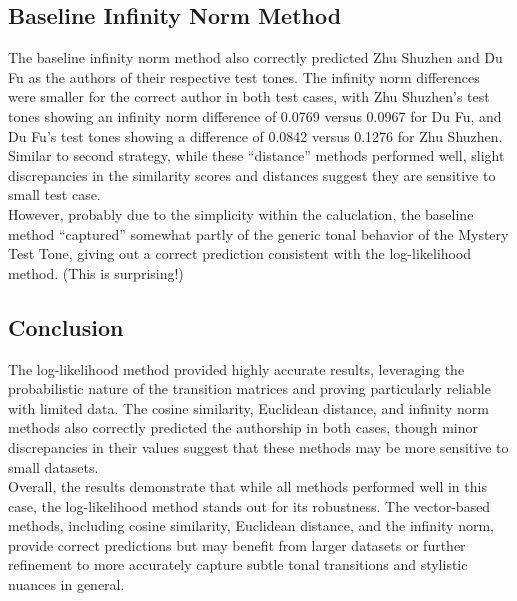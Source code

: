 \documentclass[12pt]{article}
\begin{document}
\subsection*{Baseline Infinity Norm Method}
The baseline infinity norm method also correctly predicted Zhu Shuzhen and Du Fu as the authors of their respective test tones. The infinity norm differences were smaller for the correct author in both test cases, with Zhu Shuzhen's test tones showing an infinity norm difference of 0.0769 versus 0.0967 for Du Fu, and Du Fu's test tones showing a difference of 0.0842 versus 0.1276 for Zhu Shuzhen.
\\
Similar to second strategy, while these ``distance'' methods performed well, slight discrepancies in the similarity scores and distances suggest they are sensitive to small test case.
\\
However, probably due to the simplicity within the caluclation, the baseline method ``captured'' somewhat partly of the generic tonal behavior of the Mystery Test Tone, giving out a correct prediction consistent with the log-likelihood method. (This is surprising!) 
\subsection*{Conclusion}
The log-likelihood method provided highly accurate results, leveraging the probabilistic nature of the transition matrices and proving particularly reliable with limited data. The cosine similarity, Euclidean distance, and infinity norm methods also correctly predicted the authorship in both cases, though minor discrepancies in their values suggest that these methods may be more sensitive to small datasets.
\\
Overall, the results demonstrate that while all methods performed well in this case, the log-likelihood method stands out for its robustness. The vector-based methods, including cosine similarity, Euclidean distance, and the infinity norm, provide correct predictions but may benefit from larger datasets or further refinement to more accurately capture subtle tonal transitions and stylistic nuances in general.
\end{document}
